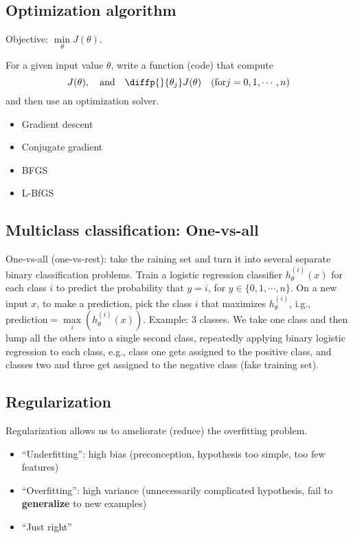 %
\subsection{Optimization algorithm}
Objective: $\underset{\theta}{\min} J(\theta)$.

For a given input value $\theta$, write a function (code) that compute 
\begin{equation*}
J(\theta), \quad \text{and} \quad \diffp{ }{{\theta_j}} J(\theta)  \quad (\text{for} j=0,1, \cdots, n)
\end{equation*}
and then use an optimization solver.

\begin{itemize}
\item Gradient descent
\item Conjugate gradient
\item BFGS
\item L-BfGS
\end{itemize}

%
\subsection{Multiclass classification: One-vs-all}
One-vs-all (one-vs-rest): take the raining set and turn it into several separate binary classification problems.
Train a logistic regression classifier $h_\theta^{(i)}(x)$ for each class $i$ to predict the probability that $y=i$, for $y \in \{0, 1, \cdots, n\}$. On a new input $x$, to make a prediction, pick the class $i$ that maximizes $h_\theta^{(i)}$, i.g.,  $\text{prediction} = \underset{i}{\max}(h_\theta^{(i)}(x))$. Example: 3 classes. We take one class and then lump all the others into a single second class, repeatedly applying binary logistic regression to each class, e.g., class one gets assigned to the positive class, and classes two and three get assigned to the negative class (fake training set).

%
\subsection{Regularization}
Regularization allows us to ameliorate (reduce) the overfitting problem.\\
\begin{itemize}
\item
``Underfitting'': high bias (preconception, hypothesis too simple, too few features)
\item
``Overfitting'': high variance (unnecessarily complicated hypothesis, fail to \textbf{generalize} to new examples)
\item
``Just right''
\end{itemize}

